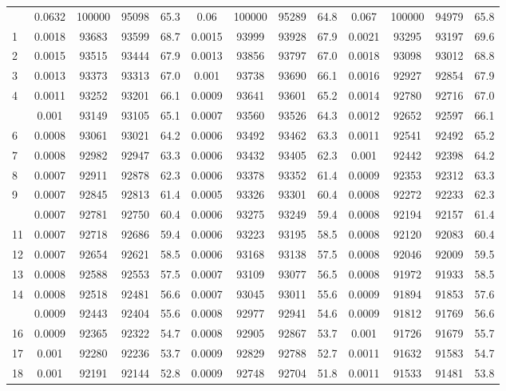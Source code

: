 \documentclass[
  14pt,
]{article}
\begin{document}
\begin{longtable}[t]{lcccccccccccc}
\endfoot
\bottomrule
\endlastfoot
0 & 0.0632 & 100000 & 95098 & 65.3 & 0.06 & 100000 & 95289 & 64.8 & 0.067 & 100000 & 94979 & 65.8\\
1 & 0.0018 & 93683 & 93599 & 68.7 & 0.0015 & 93999 & 93928 & 67.9 & 0.0021 & 93295 & 93197 & 69.6\\
2 & 0.0015 & 93515 & 93444 & 67.9 & 0.0013 & 93856 & 93797 & 67.0 & 0.0018 & 93098 & 93012 & 68.8\\
3 & 0.0013 & 93373 & 93313 & 67.0 & 0.001 & 93738 & 93690 & 66.1 & 0.0016 & 92927 & 92854 & 67.9\\
4 & 0.0011 & 93252 & 93201 & 66.1 & 0.0009 & 93641 & 93601 & 65.2 & 0.0014 & 92780 & 92716 & 67.0\\
\addlinespace
5 & 0.001 & 93149 & 93105 & 65.1 & 0.0007 & 93560 & 93526 & 64.3 & 0.0012 & 92652 & 92597 & 66.1\\
6 & 0.0008 & 93061 & 93021 & 64.2 & 0.0006 & 93492 & 93462 & 63.3 & 0.0011 & 92541 & 92492 & 65.2\\
7 & 0.0008 & 92982 & 92947 & 63.3 & 0.0006 & 93432 & 93405 & 62.3 & 0.001 & 92442 & 92398 & 64.2\\
8 & 0.0007 & 92911 & 92878 & 62.3 & 0.0006 & 93378 & 93352 & 61.4 & 0.0009 & 92353 & 92312 & 63.3\\
9 & 0.0007 & 92845 & 92813 & 61.4 & 0.0005 & 93326 & 93301 & 60.4 & 0.0008 & 92272 & 92233 & 62.3\\
\addlinespace
10 & 0.0007 & 92781 & 92750 & 60.4 & 0.0006 & 93275 & 93249 & 59.4 & 0.0008 & 92194 & 92157 & 61.4\\
11 & 0.0007 & 92718 & 92686 & 59.4 & 0.0006 & 93223 & 93195 & 58.5 & 0.0008 & 92120 & 92083 & 60.4\\
12 & 0.0007 & 92654 & 92621 & 58.5 & 0.0006 & 93168 & 93138 & 57.5 & 0.0008 & 92046 & 92009 & 59.5\\
13 & 0.0008 & 92588 & 92553 & 57.5 & 0.0007 & 93109 & 93077 & 56.5 & 0.0008 & 91972 & 91933 & 58.5\\
14 & 0.0008 & 92518 & 92481 & 56.6 & 0.0007 & 93045 & 93011 & 55.6 & 0.0009 & 91894 & 91853 & 57.6\\
\addlinespace
15 & 0.0009 & 92443 & 92404 & 55.6 & 0.0008 & 92977 & 92941 & 54.6 & 0.0009 & 91812 & 91769 & 56.6\\
16 & 0.0009 & 92365 & 92322 & 54.7 & 0.0008 & 92905 & 92867 & 53.7 & 0.001 & 91726 & 91679 & 55.7\\
17 & 0.001 & 92280 & 92236 & 53.7 & 0.0009 & 92829 & 92788 & 52.7 & 0.0011 & 91632 & 91583 & 54.7\\
18 & 0.001 & 92191 & 92144 & 52.8 & 0.0009 & 92748 & 92704 & 51.8 & 0.0011 & 91533 & 91481 & 53.8\\

\end{longtable}
\end{document}
